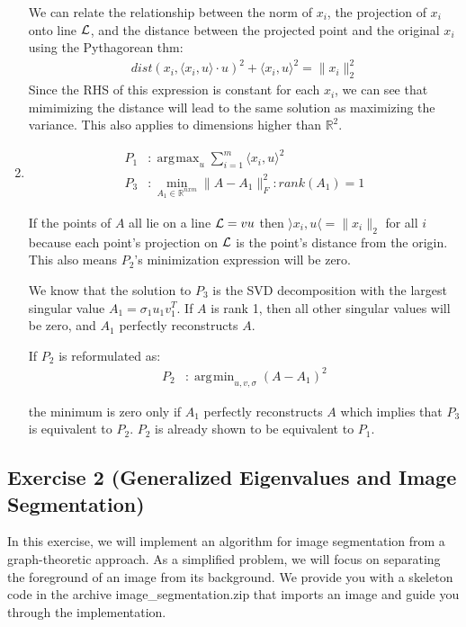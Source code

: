 \documentclass[11pt]{article}
\DeclareMathOperator*{\argmax}{arg\!max}
\DeclareMathOperator*{\argmin}{arg\!min}
\begin{document}
\begin{solution}
\begin{enumerate}
    We can relate the relationship between the norm of $x_i$, the projection of $x_i$ onto line $\cal L$, and the distance between the projected point and the original $x_i$ using the Pythagorean thm:
    \begin{align*}
        dist(x_i, \langle x_i,u \rangle \cdot u)^2 + \langle x_i,u \rangle^2 = \|x_i\|_2^2
    \end{align*}
        Since the RHS of this expression is constant for each $x_i$, we can see that mimimizing the distance will lead to the same solution as maximizing the variance. This also applies to dimensions higher than $\mathbb{R}^2$.

\item
\begin{align*}
    P_1&: \argmax_u \sum_{i=1}^m \langle x_i,u \rangle^2 \\
    P_3&: \min_{A_1 \in \mathbb{R}^{nxm}} \|A - A_1\|_F^2 : rank(A_1) = 1
\end{align*}

If the points of $A$ all lie on a line ${\cal L} = vu$ then $\rangle x_i,u \langle = \|x_i\|_2$ for all $i$ because each point's projection on $\cal L$ is the point's distance from the origin. This also means $P_2$'s minimization expression will be zero.

We know that the solution to $P_3$ is the SVD decomposition with the largest singular value $A_1 = \sigma_1 u_1 v_1^T$. If $A$ is rank 1, then all other singular values will be zero, and $A_1$ perfectly reconstructs $A$.

If $P_2$ is reformulated as:
\begin{align*}
    P_2&: \argmin_{u,v,\sigma} (A - A_1)^2
\end{align*}

the minimum is zero only if $A_1$ perfectly reconstructs $A$ which implies that $P_3$ is equivalent to $P_2$. $P_2$ is already shown to be equivalent to $P_1$.
\end{enumerate}
\end{solution}

\newpage
\subsection*{Exercise 2 (Generalized Eigenvalues and Image Segmentation)}

In this exercise, we will implement an algorithm for image segmentation from a graph-theoretic approach. As a simplified problem, we will focus on separating the foreground of an image from its background. We provide you with a skeleton code in the archive image\_segmentation.zip that imports an image and guide you through the implementation.
\end{document}
